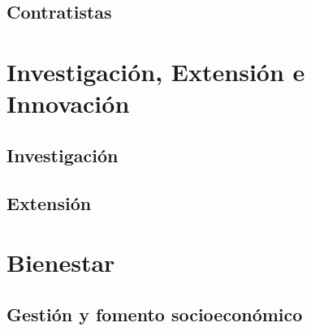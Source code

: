 \documentclass[
]{book}
\begin{document}
\hypertarget{Contrat}{%
\section{Contratistas}\label{Contrat}}

\hypertarget{Inv}{%
\chapter{Investigación, Extensión e Innovación}\label{Inv}}

\hypertarget{investigaciuxf3n}{%
\section{Investigación}\label{investigaciuxf3n}}

\hypertarget{extensiuxf3n}{%
\section{Extensión}\label{extensiuxf3n}}

\hypertarget{Bie}{%
\chapter{Bienestar}\label{Bie}}

\hypertarget{gestiuxf3n-y-fomento-socioeconuxf3mico}{%
\section{Gestión y fomento socioeconómico}\label{gestiuxf3n-y-fomento-socioeconuxf3mico}}

  
\end{document}
